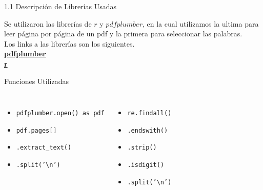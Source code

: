 \documentclass{beamer}
\begin{document}
\begin{frame}[fragile]{1.1 Descripción de Librerías Usadas}
	
	\justifying
	Se utilizaron las librerías de $r$ y $pdfplumber$, en la cual utilizamos la ultima para leer página por página de un pdf y la primera para seleccionar las palabras.\\
	\vspace{0.1cm}
	Los links a las librerías son los siguientes.\\
	\vspace{0.1cm}
	\href{https://pypi.org/project/pdfplumber/#extracting-text}{\textbf{pdfplumber}}\\
	\vspace{0.1cm}
	\href{https://docs.python.org/es/3.13/library/re.html}{\textbf{r}}
	\vspace{0.2cm}
	
\begin{block}{Funciones Utilizadas}
	\begin{columns}[c]
		\begin{itemize}
			\item \texttt{pdfplumber.open() as pdf}
			\item \texttt{pdf.pages[]}
			\item \texttt{.extract\_text()}
			\item \texttt{.split('\textbackslash n')}
		\end{itemize}
		
		\begin{itemize}
			\item \texttt{re.findall()}
			\item \texttt{.endswith()}
			\item \texttt{.strip()}
			\item \texttt{.isdigit()}
			\item \texttt{.split('\textbackslash n')}
		\end{itemize}
	\end{columns}
\end{block}
	
\end{frame}

\end{document}
